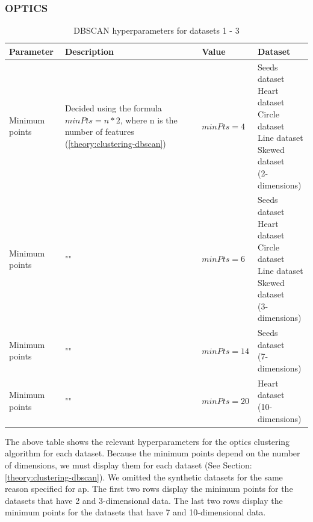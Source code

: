 \subsubsection{OPTICS}

\begin{table}[h]
      \begin{tabular}{|l|p{6cm}|l|l|}
            \hline
            Parameter      & Description                                                                                                    & Value       & Dataset                    \\
            \hline
            Minimum points & Decided using the formula $minPts = n * 2$, where n is the number of features (\ref{theory:clustering-dbscan}) & $minPts=4$  & \makecell[l]{Seeds dataset \\ Heart dataset \\ Circle dataset \\ Line dataset \\ Skewed dataset \\ (2-dimensions)}  \\
            \hline
            Minimum points & ""                                                                                                             & $minPts=6$  & \makecell[l]{Seeds dataset \\ Heart dataset \\ Circle dataset \\ Line dataset \\ Skewed dataset \\ (3-dimensions)} \\
            \hline
            Minimum points & ""                                                                                                             & $minPts=14$ & \makecell[l]{Seeds dataset \\ (7-dimensions)}  \\
            \hline
            Minimum points & ""                                                                                                             & $minPts=20$ & \makecell[l]{Heart dataset \\ (10-dimensions)} \\
            \hline
      \end{tabular}
      \caption{DBSCAN  hyperparameters for datasets 1 - 3}
      \label{tab:dbscan-formula-sklearn}
\end{table}
The above table shows the relevant hyperparameters for the \gls{optics} clustering algorithm for each dataset.
Because the minimum points depend on the number of dimensions, we must display them for each dataset (See Section: \ref{theory:clustering-dbscan}).
We omitted the synthetic datasets for the same reason specified for \gls{ap}.
The first two rows display the minimum points for the datasets that have 2 and 3-dimensional data.
The last two rows display the minimum points for the datasets that have 7 and 10-dimensional data.
\newpage
